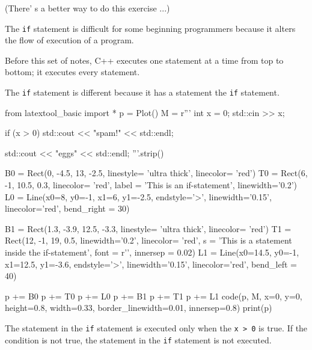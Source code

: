 (There' s a better way to do this exercise ...)

\newpage{}

The \verb!if! statement is difficult for some beginning programmers
because it alters the flow of execution of a program.

Before this set of notes, C++ executes one statement at a time from top
to bottom; it executes every statement.

The \verb!if! statement is different because it has a statement
 the \verb!if! statement.
\begin{python}
from latextool_basic import *
p = Plot()
M = r'''
int x = 0;
std::cin >> x;
                                                                          
if (x > 0)
    std::cout << "spam!" << std::endl;

std::cout << "eggs" << std::endl;
'''.strip()

B0 = Rect(0, -4.5, 13, -2.5, linestyle= 'ultra thick', linecolor= 'red')
T0 = Rect(6, -1, 10.5, 0.3,  linecolor= 'red', label = 'This is an if-statement', linewidth='0.2')
L0 = Line(x0=8, y0=-1, x1=6, y1=-2.5, endstyle='>', linewidth='0.15', linecolor='red', bend_right = 30)

B1 = Rect(1.3, -3.9, 12.5, -3.3, linestyle= 'ultra thick', linecolor= 'red')
T1 = Rect(12, -1, 19, 0.5, linewidth='0.2', linecolor= 'red', s = 'This is a statement inside the if-statement', font = r'\large', innersep = 0.02)
L1 = Line(x0=14.5, y0=-1, x1=12.5, y1=-3.6, endstyle='>', linewidth='0.15', linecolor='red', bend_left = 40)

p += B0
p += T0
p += L0
p += B1
p += T1
p += L1
code(p, M, x=0, y=0, height=0.8, width=0.33, border_linewidth=0.01, innersep=0.8)
print(p)
\end{python}


The statement in the \verb!if! statement is executed only when the
\verb!x > 0! is true. If the condition is not true, the
statement in the \verb!if! statement is not executed.

